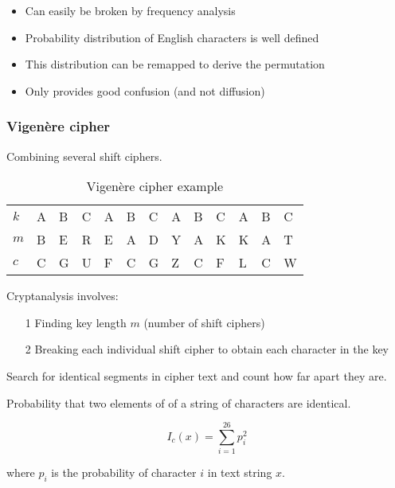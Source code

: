 \documentclass[a4paper]{article}
\begin{document}
\begin{itemize}
  \item Can easily be broken by frequency analysis
  \item Probability distribution of English characters is well defined
  \item This distribution can be remapped to derive the permutation
  \item Only provides good confusion (and not diffusion)
\end{itemize}

\subsubsection{Vigen\`ere cipher}

Combining several shift ciphers.

\begin{table}[h]
  \centering
  \begin{tabular}{@{}lllllllllllll@{}}
    \toprule
    $k$ & A & B & C & A & B & C & A & B & C & A & B & C \\
    $m$ & B & E & R & E & A & D & Y & A & K & K & A & T \\
    \midrule
    $c$ & C & G & U & F & C & G & Z & C & F & L & C & W \\
    \bottomrule
  \end{tabular}
  \caption{Vigen\`ere cipher example}
  \label{tab:vigenere_cipher_example}
\end{table}
\FloatBarrier

Cryptanalysis involves:

\begin{enumerate}
  \item[1] Finding key length $m$ (number of shift ciphers)
  \item[2] Breaking each individual shift cipher to obtain each character in the
           key
\end{enumerate}


Search for identical segments in cipher text and count how far apart they are.


Probability that two elements of of a string of characters are identical.

\[
  I_{c}(x) = \sum^{26}_{i = 1}p^{2}_{i}
\]

where $p_{i}$ is the probability of character $i$ in text string $x$.
\end{document}
